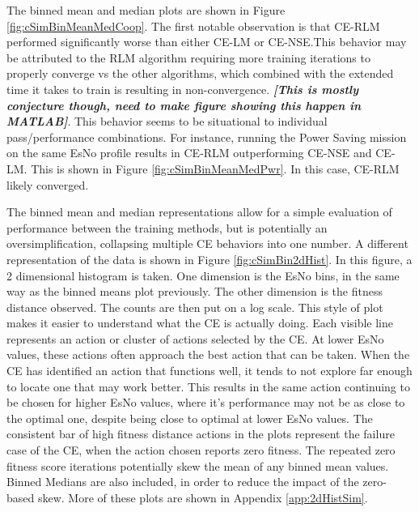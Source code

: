 \par The binned mean and median plots are shown in Figure \ref{fig:cSimBinMeanMedCoop}. The first notable observation is that CE-RLM performed significantly worse than either CE-LM or CE-NSE.This behavior may be attributed to the RLM algorithm requiring more training iterations to properly converge vs the other algorithms, which combined with the extended time it takes to train is resulting in non-convergence. \textbf{\textit{[This is mostly conjecture though, need to make figure showing this happen in MATLAB]}}. This behavior seems to be situational to individual pass/performance combinations. For instance, running the Power Saving mission on the same EsNo profile results in CE-RLM outperforming CE-NSE and CE-LM. This is shown in Figure \ref{fig:cSimBinMeanMedPwr}. In this case, CE-RLM likely converged.   

\par The binned mean and median representations allow for a simple evaluation of performance between the training methods, but is potentially an oversimplification, collapsing multiple CE behaviors into one number. A different representation of the data is shown in Figure \ref{fig:cSimBin2dHist}. In this figure, a 2 dimensional histogram is taken. One dimension is the EsNo bins, in the same way as the binned means plot previously. The other dimension is the fitness distance observed. The counts are then put on a log scale. This style of plot makes it easier to understand what the CE is actually doing. Each visible line represents an action or cluster of actions selected by the CE. At lower EsNo values, these actions often approach the best action that can be taken. When the CE has identified an action that functions well, it tends to not explore far enough to locate one that may work better. This results in the same action continuing to be chosen for higher EsNo values, where it's performance may not be as close to the optimal one, despite being close to optimal at lower EsNo values. The consistent bar of high fitness distance actions in the plots represent the failure case of the CE, when the action chosen reports zero fitness. The repeated zero fitness score iterations potentially skew the mean of any binned mean values. Binned Medians are also included, in order to reduce the impact of the zero-based skew. More of these plots are shown in Appendix \ref{app:2dHistSim}.

